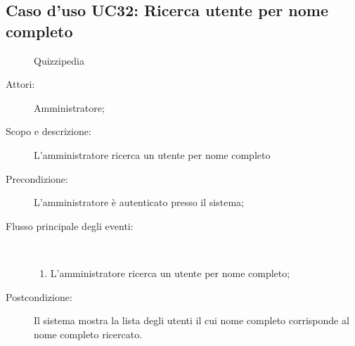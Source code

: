 \subsection{Caso d'uso UC32: Ricerca utente per nome completo}
	\begin{figure}[H]
		\centering
		\begin{resizedtikzpicture}{\textwidth}
		\begin{umlsystem}[x=0, fill=lightgray!20]{Quizzipedia}
		\end{umlsystem}
		\end{resizedtikzpicture}
		\caption{}
	\end{figure}
\begin{description}
\item[Attori:] Amministratore;
\item[Scopo e descrizione:] L'amministratore ricerca un utente per nome completo
      \item[Precondizione:] L'amministratore è autenticato presso il sistema;

        \item[Flusso principale degli eventi:] \ 
 \begin{enumerate}
          \item L'amministratore ricerca un utente per nome completo;

      \end{enumerate}
    \item[Postcondizione:] Il sistema mostra la lista degli utenti il cui nome completo corrisponde al nome completo ricercato.
  \end{description}
\hypertarget{UC33}{}

